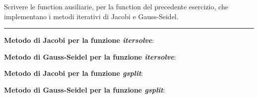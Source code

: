 Scrivere le function ausiliarie, per la function del precedente esercizio, che implementano i metodi
iterativi di Jacobi e Gauss-Seidel.

\hspace*{\fill}
\par\noindent\rule{\textwidth}{0.4pt}
\hspace*{\fill}

\begin{minipage}{\textwidth}
\textbf{Metodo di Jacobi per la funzione \textit{itersolve}}:
    
    \textbf{Metodo di Gauss-Seidel per la funzione \textit{itersolve}}:
    
\end{minipage}
\begin{minipage}{\textwidth}
    \textbf{Metodo di Jacobi per la funzione \textit{gsplit}}:
    
    \textbf{Metodo di Gauss-Seidel per la funzione \textit{gsplit}}:
    
\end{minipage}
